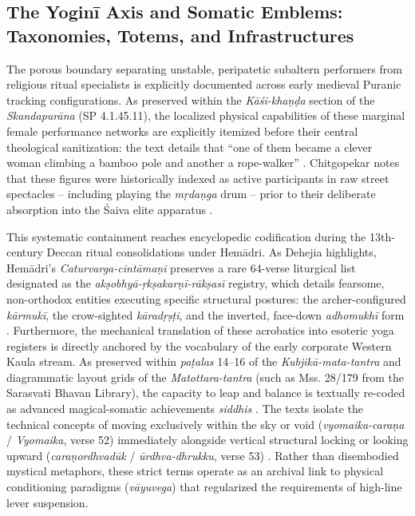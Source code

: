 \documentclass[11pt,twoside,letterpaper]{article}
\begin{document}
\subsection{The Yogin\={i} Axis and Somatic Emblems: Taxonomies, Totems, and Infrastructures}
The porous boundary separating unstable, peripatetic subaltern performers from religious ritual specialists is explicitly documented across early medieval Puranic tracking configurations. As preserved within the \textit{K\={a}\'s\={i}-kha\d{n}\d{d}a} section of the \textit{Skandapur\={a}na} (SP 4.1.45.11), the localized physical capabilities of these marginal female performance networks are explicitly itemized before their central theological sanitization: the text details that “one of them became a clever woman climbing a bamboo pole and another a rope-walker” \citep{Shastri1991}. Chitgopekar notes that these figures were historically indexed as active participants in raw street spectacles -- including playing the \textit{ m\d{r}da\d{n}ga} drum -- prior to their deliberate absorption into the \'{S}aiva elite apparatus \citep{Chitgopekar2002}.

This systematic containment reaches encyclopedic codification during the 13th-century Deccan ritual consolidations under Hem\={a}dri. As Dehejia highlights, Hem\={a}dri’s \textit{Caturvarga-cint\={a}ma\d{n}i} preserves a rare 64-verse liturgical list designated as the \textit{ak\d{s}obhy\={a}-\d{r}k\d{s}akar\d{n}\={i}-r\={a}k\d{s}as\={i}} registry, which details fearsome, non-orthodox entities executing specific structural postures: the archer-configured \textit{k\={a}rmuk\={i}}, the crow-sighted \textit{k\={a}rad\d{r}\d{s}\d{t}i}, and the inverted, face-down \textit{adhomukh\={i}} form \citep{Dehejia1986}. Furthermore, the mechanical translation of these acrobatics into esoteric yoga registers is directly anchored by the vocabulary of the early corporate Western Kaula stream. As preserved within \textit{pa\d{t}alas} 14–16 of the \textit{Kubjik\={a}-mata-tantra} and diagrammatic layout grids of the \textit{ Matottara-tantra} (such as Mss. 28/179 from the Sarasvati Bhavan Library), the capacity to leap and balance is textually re-coded as advanced magical-somatic achievements \textit{siddhis} \citep{Dehejia1986}. The texts isolate the technical concepts of moving exclusively within the sky or void (\textit{vyomaika-cara\d{n}a} / \textit{Vyomaika}, verse 52) immediately alongside vertical structural locking or looking upward (\textit{cara\d{n}ordhvad\={u}k} / \textit{\={u}rdhva-dhrukku}, verse 53) \citep{Dehejia1986, Mallinson2007}. Rather than disembodied mystical metaphors, these strict terms operate as an archival link to physical conditioning paradigms (\textit{v\={a}yuvega}) that regularized the requirements of high-line lever suspension.
\end{document}
